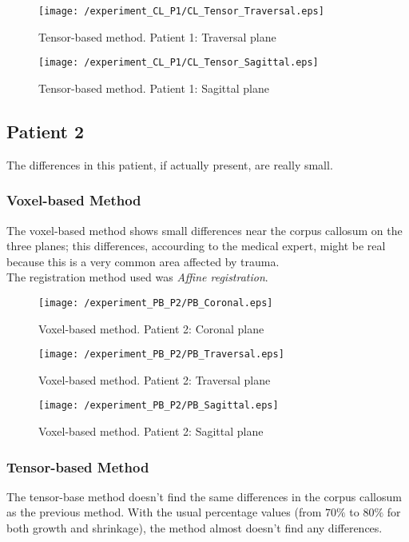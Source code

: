 \begin{figure}[H]
  \centering
  \texttt{[image: /experiment\_CL\_P1/CL\_Tensor\_Traversal.eps]}
  \caption{Tensor-based method. Patient 1: Traversal plane}
  \label{CL_TTraversal}
\end{figure}

\begin{figure}[H]
  \centering
  \texttt{[image: /experiment\_CL\_P1/CL\_Tensor\_Sagittal.eps]}
  \caption{Tensor-based method. Patient 1: Sagittal plane}
  \label{CL_TSagittal}
\end{figure}


\subsection{Patient 2}
The differences in this patient, if actually present, are really
small. 

\subsubsection{Voxel-based Method}
The voxel-based method shows small differences near the corpus
callosum on the three planes; this differences, accourding to the
medical expert, might be real because this is a very common area
affected by trauma.\\

The registration method used was \textit{Affine registration}.

\begin{figure}[H]
  \centering
  \texttt{[image: /experiment\_PB\_P2/PB\_Coronal.eps]}
  \caption{Voxel-based method. Patient 2: Coronal plane}
  \label{PB_Coronal}
\end{figure}

\begin{figure}[H]
  \centering
  \texttt{[image: /experiment\_PB\_P2/PB\_Traversal.eps]}
  \caption{Voxel-based method. Patient 2: Traversal plane}
  \label{PB_Traversal}
\end{figure}

\begin{figure}[H]
  \centering
  \texttt{[image: /experiment\_PB\_P2/PB\_Sagittal.eps]}
  \caption{Voxel-based method. Patient 2: Sagittal plane}
  \label{PB_Sagittal}
\end{figure}


\subsubsection{Tensor-based Method}
The tensor-base method doesn't find the same differences in the corpus
callosum as the previous method. With the usual percentage values
(from $70\%$ to $80\%$ for both growth and shrinkage), the method almost
doesn't find any differences. 

